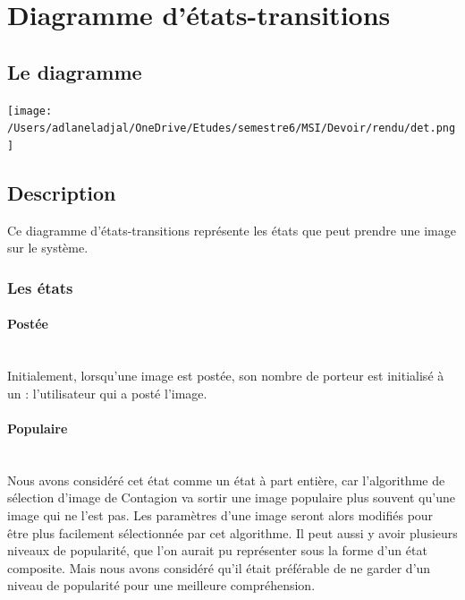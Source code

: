 \documentclass[11pt,a4paper]{article}
\begin{document}

\section{Diagramme d'états-transitions}

\subsection{Le diagramme}

\vspace{4cm}

\texttt{[image: /Users/adlaneladjal/OneDrive/Etudes/semestre6/MSI/Devoir/rendu/det.png]}

\newpage

\subsection{Description}

Ce diagramme d’états-transitions représente les états que peut prendre une image sur le système.

\subsubsection{Les états}

\paragraph{Postée}~\\
Initialement, lorsqu’une image est postée, son nombre de 
porteur est initialisé à un : l’utilisateur qui a posté 
l’image.

\paragraph{Populaire}~\\
Nous avons considéré cet état comme un état à part
entière, car l’algorithme de sélection d’image de
Contagion va sortir une image populaire plus souvent
qu’une image qui ne l’est pas. Les paramètres d’une image
seront alors modifiés pour être plus facilement 
sélectionnée par cet algorithme. Il peut aussi y avoir 
plusieurs niveaux de popularité, que l’on aurait pu 
représenter sous la forme d’un état composite. Mais nous 
avons considéré qu’il était préférable de ne garder d’un 
niveau de popularité pour une meilleure compréhension.
\end{document}
